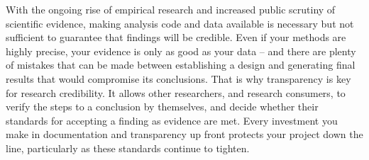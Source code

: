 \bigskip
With the ongoing rise of empirical research and increased public scrutiny of scientific evidence,
making analysis code and data available
is necessary but not sufficient to guarantee that findings will be credible.
Even if your methods are highly precise,
your evidence is only as good as your data --
and there are plenty of mistakes that can be made between
establishing a design and generating final results that would compromise its conclusions.
That is why transparency is key for research credibility.
It allows other researchers, and research consumers,
to verify the steps to a conclusion by themselves,
and decide whether their standards for accepting a finding as evidence are met.
Every investment you make in documentation and transparency up front
protects your project down the line, particularly as these standards continue to tighten.
